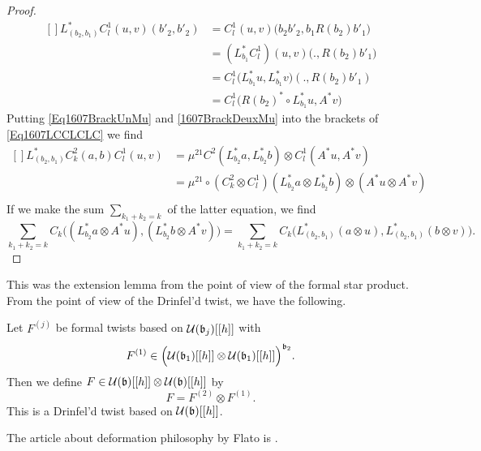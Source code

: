 \begin{proof}
\begin{equation}
		\begin{aligned}[]
			L^*_{(b_2,b_1)}C^1_l(u,v)(b'_2,b'_2)&=C^1_l(u,v)\big( b_2b'_2,b_1R(b_2)b'_1 \big)\\
			&=(L^*_{b_1}C^1_l)(u,v)\big( .,R(b_2)b'_1 \big)\\
			&=C^1_l\big( L^*_{b_1}u,L^*_{b_1}v \big)(.,R(b_2)b'_1)\\
			&=C^1_l\big( R(b_2)^*\circ L_{b_1}^*u,A^*v \big)
		\end{aligned}
	\end{equation}
	Putting \eqref{Eq1607BrackUnMu} and \eqref{1607BrackDeuxMu} into the brackets of \eqref{Eq1607LCCLCLC} we find
	\begin{equation}
		\begin{aligned}[]
			L^*_{(b_2,b_1)}C^2_k(a,b)C^1_l(u,v)&=\mu^{21} C^2(L^*_{b_2}a,L^*_{b_2}b)\otimes C^1_l(A^*u,A^*v)\\
			&=\mu^{21}\circ(C^2_k\otimes C^1_l)(L^*_{b_2}a\otimes L^*_{b_2}b)\otimes(A^*u\otimes A^*v)\\
		\end{aligned}
	\end{equation}
	If we make the sum $\sum_{k_1+k_2=k}$ of the latter equation, we find
	\begin{equation}
		\sum_{k_1+k_2=k}C_k\Big( (L^*_{b_2}a\otimes A^*u),(L^*_{b_2}b\otimes A^*v) \Big)=\sum_{k_1+k_2=k}C_k\Big( L^*_{(b_2,b_1)}(a\otimes u),L^*_{(b_2,b_1)}(b\otimes v) \Big).
	\end{equation}
\end{proof}

This was the extension lemma from the point of view of the formal star product. From the point of view of the Drinfel'd twist, we have the following.

\begin{proposition}
	Let $F^{(j)}$ be formal twists based on $\mathcal{U}(\mathfrak{b}_j)[[h]]$ with
	\begin{equation}
		F^{(1)}\in\Big( \mathcal{U}(\mathfrak{b}_1)[[h]]\otimes\mathcal{U}(\mathfrak{b}_1)[[h]] \Big)^{\mathfrak{b}_2}.
	\end{equation}
	Then we define $F\in\mathcal{U}(\mathfrak{b})[[h]]\otimes\mathcal{U}(\mathfrak{b})[[h]]$ by
	\begin{equation}
		F=F^{(2)}\otimes F^{(1)}.
	\end{equation}
	This is a Drinfel'd twist based on $\mathcal{U}(\mathfrak{b})[[h]]$.
\end{proposition}
The article about deformation philosophy by Flato is \cite{FlatoDeforView}.

